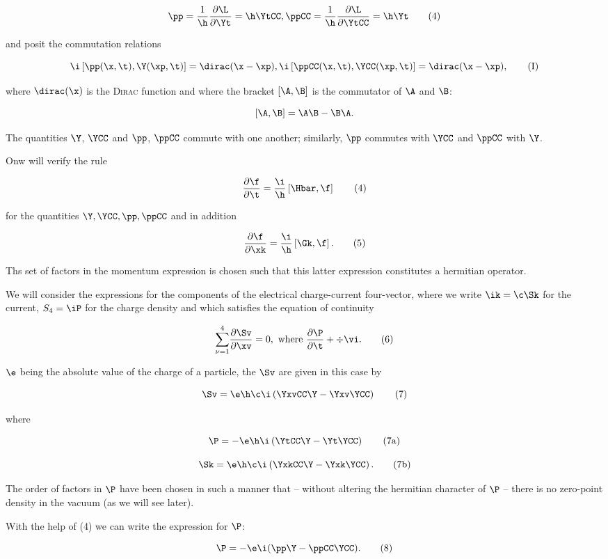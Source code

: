 \documentclass{article}
\newcommand{\var}[1]{#1}
\newcommand{\comp}[1]{{#1}}
\newcommand{\pdXdY}[2]{
\frac{\partial {#1}}{\partial {#2}}
}
\newcommand{\inv}[1]{\frac{1}{#1}}
\newcommand{\Si}[1]{{\var{S}_\comp{#1}}}
\newcommand{\commutator}[2]{\left[ #1, #2 \right]}
\renewcommand{\sc}[1]{\textsc{#1}}
\newcommand{\sumXY}[2]{\underset{#1}{\overset{#2}{\sum}}}
\newcommand{\nequ}[2]{
\begin{equation*}
#1
\tag{#2}
\end{equation*}
}
\newcommand{\uequ}[1]{
\begin{equation*}
#1
\end{equation*}
}
\begin{document}
\nequ{
\pp = \inv{\h}\pdXdY{\L}{\Yt}=\h\YtCC, \ppCC = \inv{\h}\pdXdY{\L}{\YtCC} = \h\Yt
}{4}

and posit the commutation relations

\nequ{
\i\commutator{\pp(\x, \t)}{\Y(\xp, \t)} = \dirac(\x - \xp), \i\commutator{\ppCC(\x, \t)}{\YCC(\xp, \t)} = \dirac(\x - \xp),
}{I}

where $\dirac(\x)$ is the \sc{Dirac} function and where the bracket $\commutator{\A}{\B}$ is the commutator of $\A$ and $\B$:

\uequ{
\commutator{\A}{\B} = \A\B - \B\A.
}

The quantities $\Y$, $\YCC$ and $\pp$, $\ppCC$ commute with one another; similarly, $\pp$ commutes with $\YCC$ and $\ppCC$ with $\Y$.

Onw will verify the rule

\nequ{
\pdXdY{\f}{\t} = \frac{\i}{\h}\commutator{\Hbar}{\f}
}{4}

for the quantities $\Y, \YCC, \pp, \ppCC$ and in addition

\nequ{
\pdXdY{\f}{\xk} = \frac{\i}{\h}\commutator{\Gk}{\f}.
}{5}

Ths set of factors in the momentum expression is chosen such that this latter expression constitutes a hermitian operator.

We will consider the expressions for the components of the electrical charge-current four-vector, where we write $\ik = \c\Sk$ for the current, $\Si{4} = \iP$ for the charge density and which satisfies the equation of continuity

\nequ{
\sumXY{\nu = 1}{4}\pdXdY{\Sv}{\xv} = 0, \text{ where } \pdXdY{\P}{\t} + \div \vi.
}{6}

$\e$ being the absolute value of the charge of a particle, the $\Sv$ are given in this case by

\nequ{
\Sv = \e\h\c\i\left( \YxvCC\Y - \Yxv\YCC \right)
}{7}

where

\nequ{
\P = -\e\h\i\left( \YtCC\Y - \Yt\YCC \right)
}{7a}

\nequ{
\Sk = \e\h\c\i\left( \YxkCC\Y - \Yxk\YCC \right).
}{7b}

The order of factors in $\P$ have been chosen in such a manner that -- without altering the hermitian character of $\P$ -- there is no zero-point density in the vacuum (as we will see later).

With the help of (4) we can write the expression for $\P$:

\nequ{
\P = -\e\i(\pp\Y - \ppCC\YCC).
}{8}
\end{document}
